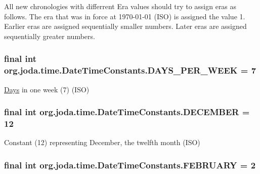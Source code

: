 All new chronologies with differrent Era values should try to assign eras as follows. The era that was in force at 1970-\/01-\/01 (I\-S\-O) is assigned the value 1. Earlier eras are assigned sequentially smaller numbers. Later eras are assigned sequentially greater numbers. \hypertarget{classorg_1_1joda_1_1time_1_1_date_time_constants_a4656643776dbe23329ecc8ab60f393c9}{
\subsubsection[{D\-A\-Y\-S\-\_\-\-P\-E\-R\-\_\-\-W\-E\-E\-K}]{\setlength{\rightskip}{0pt plus 5cm}final int org.\-joda.\-time.\-Date\-Time\-Constants.\-D\-A\-Y\-S\-\_\-\-P\-E\-R\-\_\-\-W\-E\-E\-K = 7\hspace{0.3cm}{\ttfamily [static]}}}\label{classorg_1_1joda_1_1time_1_1_date_time_constants_a4656643776dbe23329ecc8ab60f393c9}
\hyperlink{classorg_1_1joda_1_1time_1_1_days}{Days} in one week (7) (I\-S\-O) \hypertarget{classorg_1_1joda_1_1time_1_1_date_time_constants_a85300551d2446d6484e425396b8c8fb4}{
\subsubsection[{D\-E\-C\-E\-M\-B\-E\-R}]{\setlength{\rightskip}{0pt plus 5cm}final int org.\-joda.\-time.\-Date\-Time\-Constants.\-D\-E\-C\-E\-M\-B\-E\-R = 12\hspace{0.3cm}{\ttfamily [static]}}}\label{classorg_1_1joda_1_1time_1_1_date_time_constants_a85300551d2446d6484e425396b8c8fb4}
Constant (12) representing December, the twelfth month (I\-S\-O) \hypertarget{classorg_1_1joda_1_1time_1_1_date_time_constants_a8233cd8b18bbea7dafd5b400ededf12e}{
\subsubsection[{F\-E\-B\-R\-U\-A\-R\-Y}]{\setlength{\rightskip}{0pt plus 5cm}final int org.\-joda.\-time.\-Date\-Time\-Constants.\-F\-E\-B\-R\-U\-A\-R\-Y = 2\hspace{0.3cm}{\ttfamily [static]}}}\label{classorg_1_1joda_1_1time_1_1_date_time_constants_a8233cd8b18bbea7dafd5b400ededf12e}
